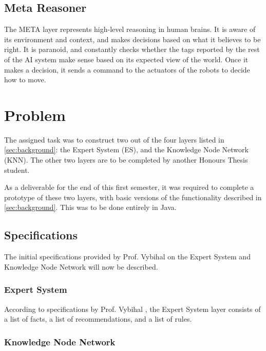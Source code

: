 \documentclass[titlepage,11pt]{article}
\begin{document}
\subsection{Meta Reasoner}

The META layer represents high-level reasoning in human brains. It is aware of its environment and context, and makes decisions based on what it believes to be right. It is paranoid, and constantly checks whether the tags reported by the rest of the AI system make sense based on its expected view of the world. Once it makes a decision, it sends a command to the actuators of the robots to decide how to move.

\section{Problem}

The assigned task was to construct two out of the four layers listed in \autoref{sec:background}: the Expert System (ES), and the Knowledge Node Network (KNN). The other two layers are to be completed by another Honours Thesis student.

As a deliverable for the end of this first semester, it was required to complete a prototype of these two layers, with basic versions of the functionality described in \autoref{sec:background}. This was to be done entirely in Java.

\subsection{Specifications}

The initial specifications provided by Prof. Vybihal on the Expert System and Knowledge Node Network will now be described.

\subsubsection{Expert System}

According to specifications by Prof. Vybihal \cite{vybihal-model}, the Expert System layer consists of a list of facts, a list of recommendations, and a list of rules.

\subsubsection{Knowledge Node Network}
\end{document}
